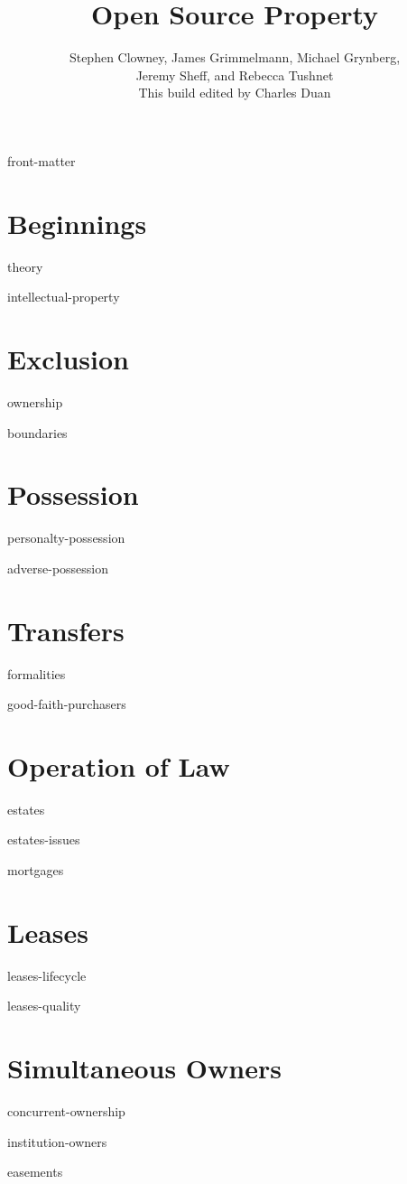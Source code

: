\documentclass[12pt]{book}
\title{Open Source Property}
\author{Stephen Clowney, James Grimmelmann, Michael Grynberg,\\
Jeremy Sheff, and Rebecca Tushnet \\[12pt]
This build edited by Charles Duan}
\begin{document}
\sloppy
\raggedbottom
\frenchspacing
{}                                                
\parskip=0pt                                                  


\frontmatter

\maketitle

\tableofcontents

\module front-matter

\mainmatter

\part{Beginnings}

\module theory

\module intellectual-property

\part{Exclusion}

\module ownership

\module boundaries

\part{Possession}

\module personalty-possession

\module adverse-possession


\part{Transfers}

\module formalities

\module good-faith-purchasers


\part{Operation of Law}

\module estates

\module estates-issues

\module mortgages

\part{Leases}

\module leases-lifecycle

\module leases-quality


\part{Simultaneous Owners}

\module concurrent-ownership

\module institution-owners

\module easements
\end{document}
